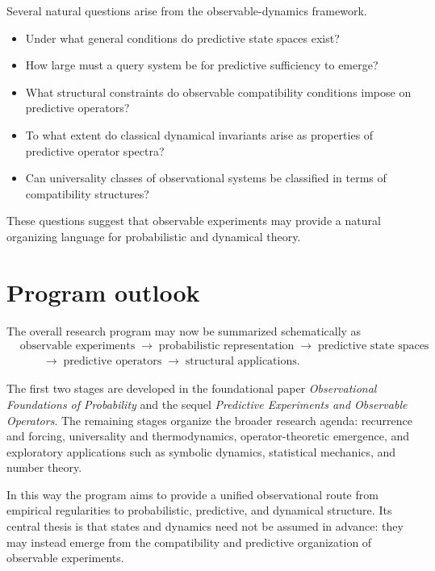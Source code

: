 \documentclass[11pt]{article}
\begin{document}
Several natural questions arise from the observable-dynamics
framework.

\begin{itemize}

\item Under what general conditions do predictive state spaces exist?

\item How large must a query system be for predictive sufficiency
to emerge?

\item What structural constraints do observable compatibility
conditions impose on predictive operators?

\item To what extent do classical dynamical invariants arise as
properties of predictive operator spectra?

\item Can universality classes of observational systems be classified
in terms of compatibility structures?

\end{itemize}

These questions suggest that observable experiments may provide a
natural organizing language for probabilistic and dynamical theory.

\section{Program outlook}

The overall research program may now be summarized schematically as
\begin{align*}
&\text{observable experiments}
\;\longrightarrow\;
\text{probabilistic representation}
\;\longrightarrow\;
\text{predictive state spaces}\\
&\qquad\longrightarrow\;
\text{predictive operators}
\;\longrightarrow\;
\text{structural applications}.
\end{align*}

The first two stages are developed in the foundational paper
\emph{Observational Foundations of Probability} and the sequel
\emph{Predictive Experiments and Observable Operators}.  The remaining
stages organize the broader research agenda: recurrence and forcing,
universality and thermodynamics, operator-theoretic emergence, and
exploratory applications such as symbolic dynamics, statistical
mechanics, and number theory.

In this way the program aims to provide a unified observational route
from empirical regularities to probabilistic, predictive, and dynamical
structure.  Its central thesis is that states and dynamics need not be
assumed in advance: they may instead emerge from the compatibility and
predictive organization of observable experiments.
\end{document}
